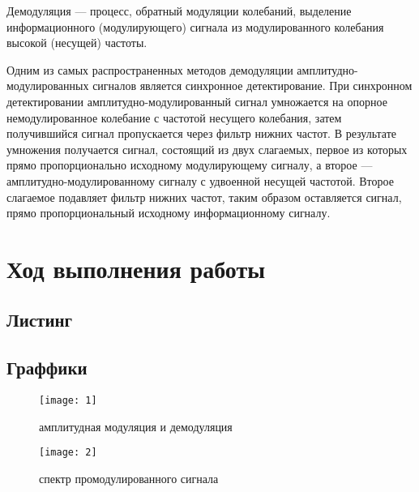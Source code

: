 Демодуляция — процесс, обратный модуляции колебаний, выделение информационного (модулирующего) сигнала из модулированного колебания высокой (несущей) частоты. 

 Одним из самых распространенных методов демодуляции амплитудно-модулированных сигналов является синхронное детектирование. При синхронном детектировании амплитудно-модулированный сигнал умножается на опорное немодулированное колебание с частотой несущего колебания, затем получившийся сигнал пропускается через фильтр нижних частот. В результате умножения получается сигнал, состоящий из двух слагаемых, первое из которых прямо пропорционально исходному модулирующему сигналу, а второе — амплитудно-модулированному сигналу с удвоенной несущей частотой. Второе слагаемое подавляет фильтр нижних частот, таким образом оставляется сигнал, прямо пропорциональный исходному информационному сигналу.





\section{Ход выполнения работы}

\subsection{Листинг}


\parindent=1cm %

\subsection{Граффики}

\begin{figure}[H]
	\begin{center}
		\texttt{[image: 1]}
		\caption{амплитудная модуляция и демодуляция} 
		\label{pic:1} %
	\end{center}
\end{figure}

\begin{figure}[H]
	\begin{center}
		\texttt{[image: 2]}
		\caption{спектр промодулированного сигнала} 
		\label{pic:triangle_spectrum} %
	\end{center}
\end{figure}

